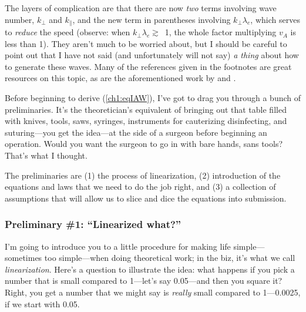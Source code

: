 The layers of complication are that there are now \emph{two} terms involving
wave number, $k_\perp$ and $k_\parallel$, and the new term in parentheses
involving $k_\perp \lambda_e$, which serves to \emph{reduce} the \Alf speed
(observe: when $k_\perp \lambda_e \gtrsim$~1, the whole factor multiplying $v_A$
is less than 1). They aren't much to be worried about, but I should be careful
to point out that I have not said (and unfortunately will not say) \emph{a
  thing} about how to generate these waves. Many of the references given in the
footnotes are great resources on this topic, as are the aforementioned work by
\citet{Lysak1996} and \citet{Genot2004a}.

Before beginning to derive (\ref{ch1:eqIAW}), I've got to drag you through a
bunch of preliminaries. It's the theoretician's equivalent of bringing out that
table filled with knives, tools, saws, syringes, instruments for cauterizing
disinfecting, and suturing---you get the idea---at the side of a surgeon before
beginning an operation. Would you want the surgeon to go in with bare hands,
sans tools? That's what I thought.

The preliminaries are (1) the process of linearization, (2) introduction of the
equations and laws that we need to do the job right, and (3) a collection of
assumptions that will allow us to slice and dice the equations into submission.




\subsubsection{Preliminary \#1: ``Linearized what?''}

I'm going to introduce you to a little procedure for making life
simple---sometimes too simple---when doing theoretical work; in the biz, it's
what we call \emph{linearization}. Here's a question to illustrate the idea:
what happens if you pick a number that is small compared to 1---let's say
0.05---and then you square it? Right, you get a number that we might say is
\emph{really} small compared to 1---0.0025, if we start with 0.05.

